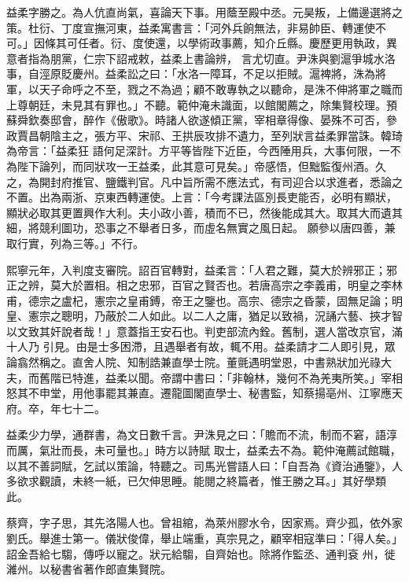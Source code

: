 \begin{pinyinscope}
 益柔字勝之。為人伉直尚氣，喜論天下事。用蔭至殿中丞。元昊叛，上備邊選將之策。杜衍、丁度宣撫河東，益柔寓書言：「河外兵餉無法，非易帥臣、轉運使不可。」因條其可任者。衍、度使還，以學術政事薦，知介丘縣。慶歷更用執政，異意者指為朋黨，仁宗下詔戒敕，益柔上書論辨，
 言尤切直。尹洙與劉滬爭城水洛事，自涇原貶慶州。益柔訟之曰：「水洛一障耳，不足以拒賊。滬裨將，洙為將軍，以天子命呼之不至，戮之不為過；顧不敢專執之以聽命，是洙不伸將軍之職而上尊朝廷，未見其有罪也。」不聽。範仲淹未識面，以館閣薦之，除集賢校理。預蘇舜欽奏邸會，醉作《傲歌》。時諸人欲遂傾正黨，宰相章得像、晏殊不可否，參政賈昌朝陰主之，張方平、宋祁、王拱辰攻排不遺力，至列狀言益柔罪當誅。韓琦為帝言：「益柔狂
 語何足深計。方平等皆陛下近臣，今西陲用兵，大事何限，一不為陛下論列，而同狀攻一王益柔，此其意可見矣。」帝感悟，但黜監復州酒。久之，為開封府推官、鹽鐵判官。凡中旨所需不應法式，有司迎合以求進者，悉論之不置。出為兩浙、京東西轉運使。上言：「今考課法區別長吏能否，必明有顯狀，顯狀必取其更置興作大利。夫小政小善，積而不已，然後能成其大。取其大而遺其細，將競利圖功，恐事之不舉者日多，而虛名無實之風日起。
 願參以唐四善，兼取行實，列為三等。」不行。



 熙寧元年，入判度支審院。詔百官轉對，益柔言：「人君之難，莫大於辨邪正；邪正之辨，莫大於置相。相之忠邪，百官之賢否也。若唐高宗之李義甫，明皇之李林甫，德宗之盧杞，憲宗之皇甫鎛，帝王之鑒也。高宗、德宗之昏蒙，固無足論；明皇、憲宗之聰明，乃蔽於二人如此。以二人之庸，猶足以致禍，況誦六藝、挾才智以文致其奸說者哉！」意蓋指王安石也。判吏部流內銓。舊制，選人當改京官，滿十人乃
 引見。由是士多困滯，且遇舉者有故，輒不用。益柔請才二人即引見，眾論翕然稱之。直舍人院、知制誥兼直學士院。董氈遇明堂恩，中書熟狀加光祿大夫，而舊階已特進，益柔以聞。帝謂中書曰：「非翰林，幾何不為羌夷所笑。」宰相怒其不申堂，用他事罷其兼直。遷龍圖閣直學士、秘書監，知蔡揚亳州、江寧應天府。卒，年七十二。



 益柔少力學，通群書，為文日數千言。尹洙見之曰：「贍而不流，制而不窘，語淳而厲，氣壯而長，未可量也。」時方以詩賦
 取士，益柔去不為。範仲淹薦試館職，以其不善詞賦，乞試以策論，特聽之。司馬光嘗語人曰：「自吾為《資治通鑒》，人多欲求觀讀，未終一紙，已欠伸思睡。能閱之終篇者，惟王勝之耳。」其好學類此。



 蔡齊，字子思，其先洛陽人也。曾祖綰，為萊州膠水令，因家焉。齊少孤，依外家劉氏。舉進士第一。儀狀俊偉，舉止端重，真宗見之，顧宰相寇準曰：「得人矣。」詔金吾給七騶，傳呼以寵之。狀元給騶，自齊始也。除將作監丞、通判袞
 州，徙濰州。以秘書省著作郎直集賢院。




\end{pinyinscope}
